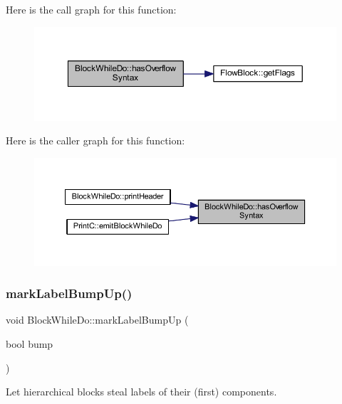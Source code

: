 Here is the call graph for this function\+:
\nopagebreak
\begin{figure}[H]
\begin{center}
\leavevmode
\includegraphics[width=350pt]{class_block_while_do_a3ab5b1bf634b0301449da7366e78f352_cgraph}
\end{center}
\end{figure}
Here is the caller graph for this function\+:
\nopagebreak
\begin{figure}[H]
\begin{center}
\leavevmode
\includegraphics[width=350pt]{class_block_while_do_a3ab5b1bf634b0301449da7366e78f352_icgraph}
\end{center}
\end{figure}
\mbox{\label{class_block_while_do_ac850d56fa3365a195b91373ef00d7bd3}} 
\subsubsection{\texorpdfstring{markLabelBumpUp()}{markLabelBumpUp()}}
{\footnotesize\ttfamily void Block\+While\+Do\+::mark\+Label\+Bump\+Up (\begin{DoxyParamCaption}\item[{bool}]{bump }\end{DoxyParamCaption})\hspace{0.3cm}{\ttfamily [virtual]}}



Let hierarchical blocks steal labels of their (first) components. 


